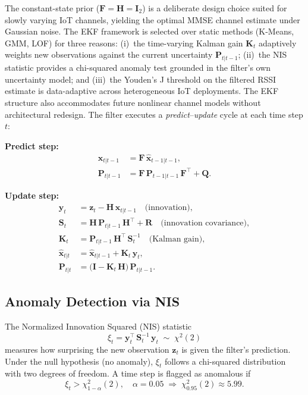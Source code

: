 \documentclass[12pt,a4paper]{article}
\begin{document}
The constant-state prior ($\mathbf{F}=\mathbf{H}=\mathbf{I}_2$) is a
deliberate design choice suited for slowly varying IoT channels, yielding
the optimal MMSE channel estimate under Gaussian noise. The EKF framework
is selected over static methods (K-Means, GMM, LOF) for three reasons:
(i)~the time-varying Kalman gain $\mathbf{K}_t$ adaptively weights new
observations against the current uncertainty $\mathbf{P}_{t|t-1}$;
(ii)~the NIS statistic provides a chi-squared anomaly test grounded in
the filter's own uncertainty model; and (iii)~the Youden's J threshold
on the filtered RSSI estimate is data-adaptive across heterogeneous
IoT deployments. The EKF structure also accommodates future nonlinear
channel models without architectural redesign.
The filter executes a \textit{predict}–\textit{update} cycle at each time
step $t$:

\vspace{4pt}
\noindent\textbf{Predict step:}
\begin{align}
\hat{\mathbf{x}}_{t|t-1} &= \mathbf{F}\,\hat{\mathbf{x}}_{t-1|t-1},
\label{eq:pred_x}\\
\mathbf{P}_{t|t-1} &= \mathbf{F}\,\mathbf{P}_{t-1|t-1}\,\mathbf{F}^\top + \mathbf{Q}.
\label{eq:pred_p}
\end{align}

\noindent\textbf{Update step:}
\begin{align}
\mathbf{y}_t &= \mathbf{z}_t - \mathbf{H}\,\hat{\mathbf{x}}_{t|t-1}
\quad\text{(innovation)},
\label{eq:innov}\\
\mathbf{S}_t &= \mathbf{H}\,\mathbf{P}_{t|t-1}\,\mathbf{H}^\top + \mathbf{R}
\quad\text{(innovation covariance)},
\label{eq:innov_cov}\\
\mathbf{K}_t &= \mathbf{P}_{t|t-1}\,\mathbf{H}^\top\,\mathbf{S}_t^{-1}
\quad\text{(Kalman gain)},
\label{eq:kgain}\\
\hat{\mathbf{x}}_{t|t} &= \hat{\mathbf{x}}_{t|t-1} + \mathbf{K}_t\,\mathbf{y}_t,
\label{eq:upd_x}\\
\mathbf{P}_{t|t} &= \bigl(\mathbf{I} - \mathbf{K}_t\,\mathbf{H}\bigr)\,\mathbf{P}_{t|t-1}.
\label{eq:upd_p}
\end{align}

\subsection{Anomaly Detection via NIS}

The Normalized Innovation Squared (NIS) statistic
\begin{equation}
\xi_t = \mathbf{y}_t^\top\,\mathbf{S}_t^{-1}\,\mathbf{y}_t
\;\sim\;\chi^2(2)
\label{eq:nis}
\end{equation}
measures how surprising the new observation $\mathbf{z}_t$ is given the
filter's prediction. Under the null hypothesis (no anomaly), $\xi_t$
follows a chi-squared distribution with two degrees of freedom. A time
step is flagged as anomalous if
\begin{equation}
\xi_t > \chi^2_{1-\alpha}(2),\quad \alpha = 0.05
\;\Rightarrow\; \chi^2_{0.95}(2) \approx 5.99.
\label{eq:anomaly_flag}
\end{equation}
\end{document}
